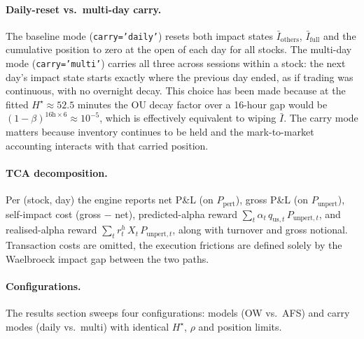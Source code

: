\documentclass[11pt,a4paper]{article}
\begin{document}
\paragraph{Daily-reset vs.\ multi-day carry.}
The baseline mode (\texttt{carry='daily'}) resets both impact states $\bar I_{\text{others}}$, $\bar I_{\text{full}}$ and the cumulative position to zero at the open of each day for all stocks. The multi-day mode (\texttt{carry='multi'}) carries all three across sessions within a stock: the next day's impact state starts exactly where the previous day ended, as if trading was continuous, with no overnight decay.  This choice has been made because at the fitted $H^\star\approx 52.5$ minutes the OU decay factor over a 16-hour gap would be $(1-\beta)^{16\text{h}\times 6}\approx 10^{-5}$, which is effectively equivalent to wiping $\bar I$. The carry mode matters because inventory continues to be held and the mark-to-market accounting interacts with that carried position.


\paragraph{TCA decomposition.}
Per (stock, day) the engine reports net P\&L (on $P_{\text{pert}}$),
gross P\&L (on $P_{\text{unpert}}$), self-impact cost (gross $-$ net),
predicted-alpha reward
$\sum_t \alpha_t\, q_{\text{us},t}\, P_{\text{unpert},t}$,
and realised-alpha reward
$\sum_t r^{h}_t\, X_t\, P_{\text{unpert},t}$,
along with turnover and gross notional. Transaction costs are omitted, the execution frictions are defined solely by the Waelbroeck impact gap between the two paths.

\paragraph{Configurations.}
The results section sweeps four configurations: models
(OW vs.\ AFS) and carry modes (daily vs.\ multi) with identical
$H^\star$, $\rho$ and position limits.
\end{document}
